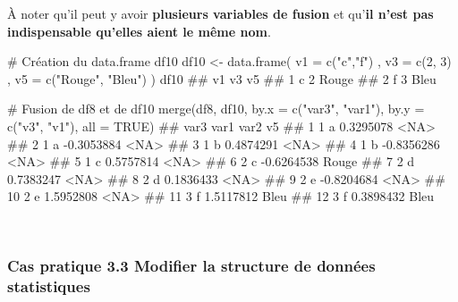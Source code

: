 \documentclass[12pt,twosided, notitlepage]{book}
\newenvironment{Shaded}{}{}
\newcommand{\KeywordTok}[1]{\textcolor[rgb]{0.00,0.00,1.00}{#1}}
\newcommand{\DataTypeTok}[1]{#1}
\newcommand{\DecValTok}[1]{#1}
\newcommand{\StringTok}[1]{\textcolor[rgb]{0.00,0.50,0.50}{#1}}
\newcommand{\CommentTok}[1]{\textcolor[rgb]{0.00,0.50,0.00}{#1}}
\newcommand{\OtherTok}[1]{\textcolor[rgb]{1.00,0.25,0.00}{#1}}
\newcommand{\NormalTok}[1]{#1}
\renewenvironment{Shaded}{\begin{snugshade}}{\end{snugshade}}
\begin{document}
À noter qu'il peut y avoir \textbf{plusieurs variables de fusion} et
qu'\textbf{il n'est pas indispensable qu'elles aient le même nom}.

\begin{Shaded}
\begin{Highlighting}[]
\CommentTok{# Création du data.frame df10}
\NormalTok{df10 <-}\StringTok{ }\KeywordTok{data.frame}\NormalTok{(}
  \DataTypeTok{v1 =} \KeywordTok{c}\NormalTok{(}\StringTok{"c"}\NormalTok{,}\StringTok{"f"}\NormalTok{)}
\NormalTok{  , }\DataTypeTok{v3 =} \KeywordTok{c}\NormalTok{(}\DecValTok{2}\NormalTok{, }\DecValTok{3}\NormalTok{)}
\NormalTok{  , }\DataTypeTok{v5 =} \KeywordTok{c}\NormalTok{(}\StringTok{"Rouge"}\NormalTok{, }\StringTok{"Bleu"}\NormalTok{)}
\NormalTok{)}
\NormalTok{df10}
\NormalTok{  ##   v1 v3    v5}
\NormalTok{  ## 1  c  2 Rouge}
\NormalTok{  ## 2  f  3  Bleu}

\CommentTok{# Fusion de df8 et de df10}
\KeywordTok{merge}\NormalTok{(df8, df10, }\DataTypeTok{by.x =} \KeywordTok{c}\NormalTok{(}\StringTok{"var3"}\NormalTok{, }\StringTok{"var1"}\NormalTok{), }\DataTypeTok{by.y =} \KeywordTok{c}\NormalTok{(}\StringTok{"v3"}\NormalTok{, }\StringTok{"v1"}\NormalTok{), }\DataTypeTok{all =} \OtherTok{TRUE}\NormalTok{)}
\NormalTok{  ##    var3 var1       var2    v5}
\NormalTok{  ## 1     1    a  0.3295078  <NA>}
\NormalTok{  ## 2     1    a -0.3053884  <NA>}
\NormalTok{  ## 3     1    b  0.4874291  <NA>}
\NormalTok{  ## 4     1    b -0.8356286  <NA>}
\NormalTok{  ## 5     1    c  0.5757814  <NA>}
\NormalTok{  ## 6     2    c -0.6264538 Rouge}
\NormalTok{  ## 7     2    d  0.7383247  <NA>}
\NormalTok{  ## 8     2    d  0.1836433  <NA>}
\NormalTok{  ## 9     2    e -0.8204684  <NA>}
\NormalTok{  ## 10    2    e  1.5952808  <NA>}
\NormalTok{  ## 11    3    f  1.5117812  Bleu}
\NormalTok{  ## 12    3    f  0.3898432  Bleu}
\end{Highlighting}
\end{Shaded}

~

\subsubsection{\texorpdfstring{\textbf{Cas pratique 3.3} Modifier la
structure de données
statistiques}{Cas pratique 3.3 Modifier la structure de données statistiques}}\label{cas-pratique-3.3-modifier-la-structure-de-donnees-statistiques}

\end{document}

